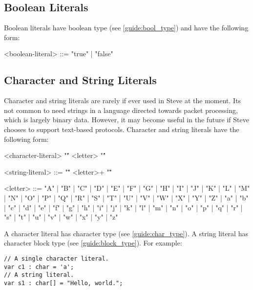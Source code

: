 \subsection{Boolean Literals}

Boolean literals have boolean type (see \ref{guide:bool_type}) and have the following form:

\begin{minip}
\begin{grammar}
<boolean-literal> ::= "true" | "false"
\end{grammar}
\end{minip}

\subsection{Character and String Literals}

Character and string literals are rarely if ever used in Steve at the moment. Its not common to need strings in a language directed towards packet processing, which is largely binary data. However, it may become useful in the future if Steve chooses to support text-based protocols.  Character and string literals have the following form:

\begin{minip}
\begin{grammar}
<character-literal> "\'" <letter> "\'"

<string-literal> ::= "\"" <letter>+ "\""

<letter> ::= "A" | "B" | "C" | "D" | "E" | "F" | "G"
       | "H" | "I" | "J" | "K" | "L" | "M" | "N"
       | "O" | "P" | "Q" | "R" | "S" | "T" | "U"
       | "V" | "W" | "X" | "Y" | "Z" | "a" | "b"
       | "c" | "d" | "e" | "f" | "g" | "h" | "i"
       | "j" | "k" | "l" | "m" | "n" | "o" | "p"
       | "q" | "r" | "s" | "t" | "u" | "v" | "w"
       | "x" | "y" | "z"
\end{grammar}
\end{minip}

A character literal has character type (see \ref{guide:char_type}). A string literal has character block type (see \ref{guide:block_type}).
For example:

\begin{minip}
\begin{lstlisting}
// A single character literal.
var c1 : char = 'a';
// A string literal.
var s1 : char[] = "Hello, world."; 
\end{lstlisting}
\end{minip}

